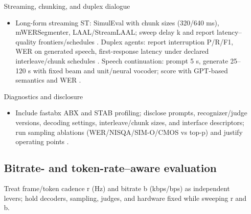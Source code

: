 \documentclass{article}
\begin{document}
Streaming, chunking, and duplex dialogue
\begin{itemize}
  \item Long-form streaming ST: SimulEval with chunk sizes (320/640 ms), mWERSegmenter, LAAL/StreamLAAL; sweep delay k and report latency--quality frontiers/schedules \cite{guo2025streamuniachievingstreamingspeechtransla,zhao2024textlessstreamingspeechtranslationsemant}. Duplex agents: report interruption P/R/F1, WER on generated speech, first-response latency under declared interleave/chunk schedules \cite{ma2024languagemodelcanlistenwhilespeaking,cui2025thinkbeforeyoutalkenhancingmeaningfuldia,hu2025salmduplexefficientdirectmodelingspeechl}. Speech continuation: prompt 5 s, generate 25--120 s with fixed beam and unit/neural vocoder; score with GPT-based semantics and WER \cite{nakata2024jchatjapaneselargescalespokendialoguecor,cui2025thinkbeforeyoutalkenhancingmeaningfuldia}.
\end{itemize}

Diagnostics and disclosure
\begin{itemize}
  \item Include fastabx ABX and STAB profiling; disclose prompts, recognizer/judge versions, decoding settings, interleave/chunk sizes, and interface descriptors; run sampling ablations (WER/NISQA/SIM-O/CMOS vs top-p) and justify operating points \cite{poli2025fastabxlibraryefficientcomputationabxdis,vashishth2024stabspeechtokenizerassessmentbenchmark,nguyen2025qwenvsgemmaintegrationwhispercomparative,li2024investigatingneuralaudiocodecsspeechlang}.
\end{itemize}

\subsection{Bitrate- and token-rate--aware evaluation} \label{subsec:Bitrate- and token-rate--aware evaluation}
Treat frame/token cadence r (Hz) and bitrate b (kbps/bps) as independent levers; hold decoders, sampling, judges, and hardware fixed while sweeping r and b.
\end{document}

